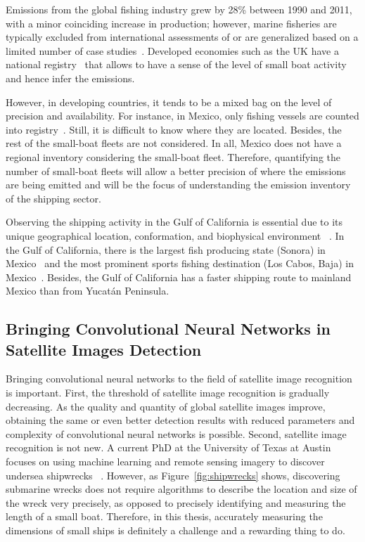 Emissions from the global fishing industry grew by 28\% between 1990 and 2011, with a minor coinciding increase in production; however, marine fisheries are typically excluded from international assessments of  or are generalized based on a limited number of case studies~\cite{parker2018fuel}. Developed economies such as the UK have a national registry~\cite{uk2021registration} that allows to have a sense of the level of small boat activity and hence infer the  emissions.

However, in developing countries, it tends to be a mixed bag on the level of precision and availability. For instance, in Mexico, only fishing vessels are counted into registry~\cite{Mexico2021RegisteredVessels}. Still, it is difficult to know where they are located. Besides, the rest of the small-boat fleets are not considered. In all, Mexico does not have a regional  inventory considering the small-boat fleet. Therefore, quantifying the number of small-boat fleets will allow a better precision of where the emissions are being emitted and will be the focus of understanding the emission inventory of the shipping sector.


Observing the shipping activity in the Gulf of California is essential due to its unique geographical location, conformation, and biophysical environment ~\cite{LLUCHCOTA20071, munguia2018ecological, MARINONE2012133}. In the Gulf of California, there is the largest fish producing state (Sonora) in Mexico~\cite{MELTZER2006222} and the most prominent sports fishing destination (Los Cabos, Baja) in Mexico~\cite{hernandez2012economic}. Besides, the Gulf of California has a faster shipping route to mainland Mexico than from Yucatán Peninsula.

\subsection{Bringing Convolutional Neural Networks in Satellite Images Detection}
Bringing convolutional neural networks to the field of satellite image recognition is important. First, the threshold of satellite image recognition is gradually decreasing. As the quality and quantity of global satellite images improve, obtaining the same or even better detection results with reduced parameters and complexity of convolutional neural networks is possible. Second, satellite image recognition is not new. A current PhD at the University of Texas at Austin focuses on using machine learning and remote sensing imagery to discover undersea shipwrecks ~\cite{character2021archaeologic}. However, as Figure~\ref {fig:shipwrecks} shows, discovering submarine wrecks does not require algorithms to describe the location and size of the wreck very precisely, as opposed to precisely identifying and measuring the length of a small boat. Therefore, in this thesis, accurately measuring the dimensions of small ships is definitely a challenge and a rewarding thing to do.

